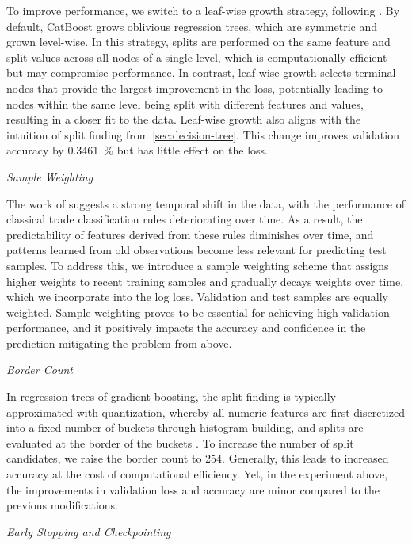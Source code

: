 To improve performance, we switch to a leaf-wise growth strategy, following \textcite[\checkmark][786]{chenXGBoostScalableTree2016}. By default, CatBoost grows oblivious regression trees, which are symmetric and grown level-wise. In this strategy, splits are performed on the same feature and split values across all nodes of a single level, which is computationally efficient but may compromise performance. In contrast, leaf-wise growth selects terminal nodes that provide the largest improvement in the loss, potentially leading to nodes within the same level being split with different features and values, resulting in a closer fit to the data. Leaf-wise growth also aligns with the intuition of split finding from \cref{sec:decision-tree}. This change improves validation accuracy by \SI{0.3461}{\percent} but has little effect on the loss.

\emph{Sample Weighting}

The work of \textcite[\checkmark][35]{grauerOptionTradeClassification2022} suggests a strong temporal shift in the data, with the performance of classical trade classification rules deteriorating over time.  As a result, the predictability of features derived from these rules diminishes over time, and patterns learned from old observations become less relevant for predicting test samples. To address this, we introduce a sample weighting scheme that assigns higher weights to recent training samples and gradually decays weights over time, which we incorporate into the log loss. Validation and test samples are equally weighted. Sample weighting proves to be essential for achieving high validation performance, and it positively impacts the accuracy and confidence in the prediction mitigating the problem from above.

\emph{Border Count}

In regression trees of gradient-boosting, the split finding is typically approximated with quantization, whereby all numeric features are first discretized into a fixed number of buckets through histogram building, and splits are evaluated at the border of the buckets \autocite[\checkmark][3147]{keLightGBMHighlyEfficient2017}. To increase the number of split candidates, we raise the border count to \num{254}. Generally, this leads to increased accuracy at the cost of computational efficiency. Yet, in the experiment above, the improvements in validation loss and accuracy are minor compared to the previous modifications.

\emph{Early Stopping and Checkpointing}

